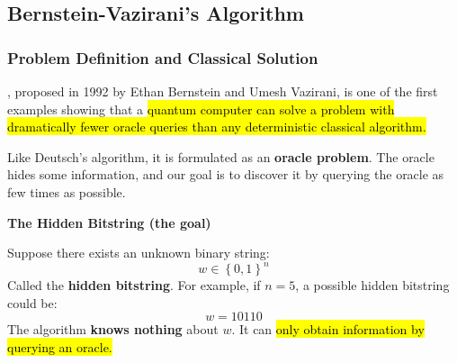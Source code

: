 \subsection{Bernstein-Vazirani's Algorithm}\label{sec:bernstein-vazirani-algorithm}

\subsubsection{Problem Definition and Classical Solution}\label{sec:bernstein-vazirani-algorithm-problem-definition-and-classical-solution}

, proposed in 1992 by Ethan Bernstein and Umesh Vazirani, is one of the first examples showing that a \hl{quantum computer can solve a problem with dramatically fewer oracle queries than any deterministic classical algorithm.}

\highspace
Like Deutsch's algorithm, it is formulated as an \textbf{oracle problem}. The oracle hides some information, and our goal is to discover it by querying the oracle as few times as possible.

\highspace
\begin{flushleft}
    \textcolor{Green3}{ \textbf{The Hidden Bitstring (the goal)}}
\end{flushleft}
Suppose there exists an unknown binary string:
\begin{equation*}
    w \in \left\{0,1\right\}^{n}
\end{equation*}
Called the \textbf{hidden bitstring}. For example, if $n=5$, a possible hidden bitstring could be:
\begin{equation*}
    w = 10110
\end{equation*}
The algorithm \textbf{knows nothing} about $w$. It can \hl{only obtain information by querying an oracle.}

